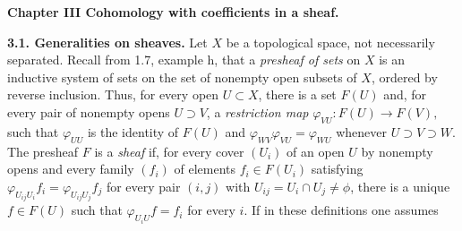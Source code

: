 \begin{center}\textbf{Chapter III Cohomology with coefficients in a sheaf.}\end{center}

\textbf{3.1. Generalities on sheaves.}\quad
{}
Let $X$ be a topological space, not necessarily separated. Recall from 1.7,
example h, that a \textit{presheaf of sets} on $X$ is an inductive system of
sets on the set of nonempty open subsets of $X$, ordered by reverse
inclusion. Thus, for every open $U\subset X$, there is a set $F(U)$ and, for
every pair of nonempty opens $U\supset V$, a \textit{restriction map}
$\varphi_{VU}:F(U)\to F(V),$
such that $\varphi_{UU}$ is the identity of $F(U)$ and
$\varphi_{WV}\varphi_{VU}=\varphi_{WU}$ whenever
$U\supset V\supset W$. The presheaf $F$ is a \textit{sheaf} if, for every
cover $(U_i)$ of an open $U$ by nonempty opens and every family $(f_i)$ of elements
$f_i\in F(U_i)$ satisfying
$\varphi_{U_{ij}U_i}f_i=\varphi_{U_{ij}U_j}f_j$
for every pair $(i,j)$ with $U_{ij}=U_i\cap U_j\ne\phi$, there is a
unique $f\in F(U)$ such that $\varphi_{U_iU}f=f_i$ for every $i$. If in these
definitions one assumes

